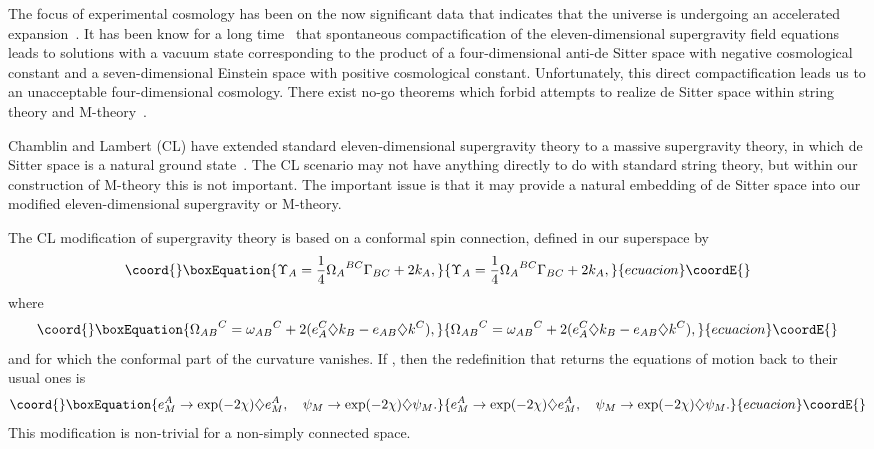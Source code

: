 \documentclass[a4paper,12pt]{article}
\begin{document}
The focus of experimental cosmology has been on the now significant data
that indicates that the universe is undergoing an accelerated
expansion~\cite{Perlmutter}. It has been know for a long
time~\cite{Duff} that spontaneous compactification of the
eleven-dimensional supergravity field equations leads to solutions with a
vacuum state corresponding to the product of a four-dimensional anti-de
Sitter space with negative cosmological constant and a seven-dimensional
Einstein space with positive cosmological constant. Unfortunately, this
direct compactification leads us to an unacceptable four-dimensional
cosmology. There exist no-go theorems which forbid attempts to realize de
Sitter space within string theory and M-theory~\cite{Maldacena}.

Chamblin and Lambert (CL) have extended standard
eleven-dimensional supergravity theory to a massive supergravity theory, in
which de Sitter space is a natural ground state~\cite{Lambert}. The CL
scenario may not have anything directly to do with standard
string theory, but within our construction of M-theory this is not
important. The important issue is that it may provide a natural embedding
of de Sitter space into our modified eleven-dimensional supergravity or
M-theory.

The CL modification of supergravity theory is based on a conformal spin
\coordHE{} connection, defined in our superspace by
\begin{equation}\coord{}\boxEquation{
\Upsilon_A=\frac{1}{4}{\Omega_A}^{BC}\Gamma_{BC}+2k_A,
}{
\Upsilon_A=\frac{1}{4}{\Omega_A}^{BC}\Gamma_{BC}+2k_A,
}{ecuacion}\coordE{}\end{equation}
where
\begin{equation}\coord{}\boxEquation{
{\Omega_{AB}}^C={\omega_{AB}}^{C}+2(e^C_A\diamondsuit
k_B-e_{AB}\diamondsuit k^C),
}{
{\Omega_{AB}}^C={\omega_{AB}}^{C}+2(e^C_A\diamondsuit
k_B-e_{AB}\diamondsuit k^C),
}{ecuacion}\coordE{}\end{equation}
and for which the conformal part of
the curvature \coordHE{} vanishes. If \coordHE{}, then the redefinition that
returns the equations of motion back to their usual ones is
\begin{equation}\coord{}\boxEquation{
e^A_M\rightarrow\exp(-2\chi)\diamondsuit e^A_M,\quad
\psi_M\rightarrow \exp(-2\chi)\diamondsuit\psi_M.
}{
e^A_M\rightarrow\exp(-2\chi)\diamondsuit e^A_M,\quad
\psi_M\rightarrow \exp(-2\chi)\diamondsuit\psi_M.
}{ecuacion}\coordE{}\end{equation} This
modification is non-trivial for a non-simply connected space.
\end{document}

